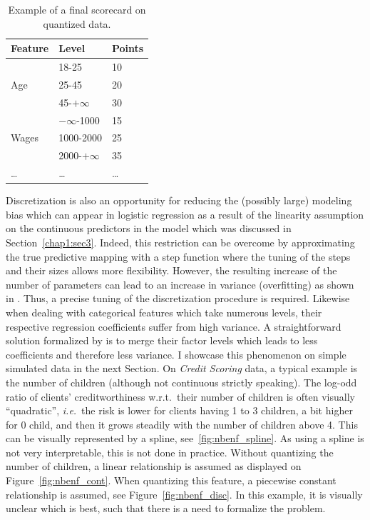 \begin{table}
\centering
\caption{\label{tab:ex_scorecard} Example of a final scorecard on quantized data.}
\begin{tabular}{p{3cm}|p{3cm}|p{2cm}}
Feature & Level & Points \\
\hline
\hline
\multirow{3}{*}{Age} & 18-25 & 10 \\
 & 25-45 & 20 \\
 & 45-$+\infty$ & 30 \\
 \hline
\multirow{3}{*}{Wages} & $-\infty$-1000 & 15 \\
 & 1000-2000 & 25 \\
 & 2000-$+\infty$ & 35 \\
 \dots & \dots & \dots \\
\end{tabular}
\end{table}


Discretization is also an opportunity for reducing the (possibly large) modeling bias which can appear in logistic regression as a result of the linearity assumption on the continuous predictors in the model which was discussed in Section~\ref{chap1:sec3}. Indeed, this restriction can be overcome by approximating the true predictive mapping with a step function where the tuning of the steps and their sizes allows more flexibility. However, the resulting increase of the number of parameters can lead to an increase in variance (overfitting) as shown in \cite{yang2009discretization}. Thus, a precise tuning of the discretization procedure is required. Likewise when dealing with categorical features which take numerous levels, their respective regression coefficients suffer from high variance. A straightforward solution formalized by \cite{maj2015delete} is to merge their factor levels which leads to less coefficients and therefore less variance. I showcase this phenomenon on simple simulated data in the next Section. On \textit{Credit Scoring} data, a typical example is the number of children (although not continuous strictly speaking). The log-odd ratio of clients' creditworthiness w.r.t.\ their number of children is often visually ``quadratic'', \textit{i.e.}\ the risk is lower for clients having 1 to 3 children, a bit higher for 0 child, and then it grows steadily with the number of children above 4. This can be visually represented by a spline, see~\ref{fig:nbenf_spline}. As using a spline is not very interpretable, this is not done in practice. Without quantizing the number of children, a linear relationship is assumed as displayed on Figure~\ref{fig:nbenf_cont}. When quantizing this feature, a piecewise constant relationship is assumed, see Figure~\ref{fig:nbenf_disc}. In this example, it is visually unclear which is best, such that there is a need to formalize the problem.


